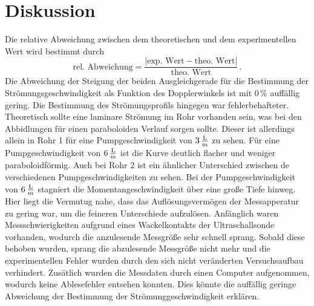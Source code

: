 \section{Diskussion}
\label{sec:Diskussion}
Die relative Abweichung zwischen dem theoretischen und dem experimentellen Wert wird bestimmt durch
$$\text{rel. Abweichung} = \frac{|\text{exp. Wert} - \text{theo. Wert}|}{\text{theo. Wert}}\,.$$
Die Abweichung der Steigung der beiden Ausgleichgerade für die Bestimmung der Strömungsgeschwindigkeit als Funktion des Dopplerwinkels ist mit $0 \, \%$
auffällig gering. Die Bestimmung des Strömungsprofils hingegen war fehlerbehafteter. Theoretisch sollte eine laminare Strömung im Rohr vorhanden sein, 
was bei den Abbidlungen für einen paraboloiden Verlauf sorgen sollte. Dieser ist allerdings allein in Rohr 1 für eine Pumpgeschwindigkeit von 
$3 \, \unit[per-mode=fraction]{\liter\per\meter}$ zu sehen. Für eine Pumpgeschwindigkeit von $6 \, \unit[per-mode=fraction]{\liter\per\meter}$
ist die Kurve deutlich flacher und weniger paraboloidförmig. Auch bei Rohr 2 ist ein ähnlicher 
Unterschied zwischen de verschiedenen Pumpgeschwindigkeiten zu sehen. Bei der Pumpgeschwindigkeit von 
$6 \, \unit[per-mode=fraction]{\liter\per\meter}$ stagniert die Momentangeschwindigkeit über eine 
große Tiefe hinweg. Hier liegt die Vermutug nahe, dass das Auflösungsvermögen der Messapperatur zu gering war,
um die feineren Unterschiede aufzulösen. 
Anfänglich waren Messschwierigkeiten aufgrund eines Wackelkontakts der Ultraschallsonde vorhanden, wodurch die anzulesende Messgröße sehr schnell sprang. 
Sobald diese behoben wurden, sprang die abzulesende Messgröße nicht mehr und die experimentellen Fehler wurden durch den sich nicht veränderten Versuchsaufbau
verhindert. Zusätlich wurden die Messdaten durch einen Computer aufgenommen, wodurch keine Ablesefehler entsehen
konnten. Dies könnte die auffällig geringe Abweichung der Bestimmung der Strömunggeschwindigkeit erklären. 